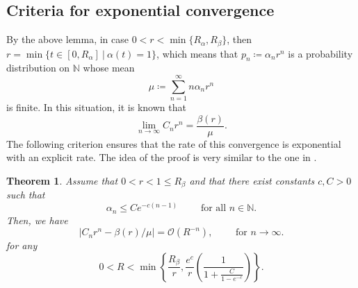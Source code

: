 \documentclass[letterpaper, DIV=17]{scrartcl}
\newtheorem{theorem}{Theorem}[section]  %
\numberwithin{equation}{section}
\theoremstyle{definition}
\begin{document}
		\subsection{Criteria for exponential convergence}
		By the above lemma, in case $ 0 < r < \min\{ R_\alpha, R_\beta \}  $, then $ r = \min\{ t \in [0,R_\alpha]    \ \big| \ \alpha(t) = 1 \} $, which means that $p_n \coloneqq \alpha_n r^n $ is a probability distribution on $ \mathbb{N} $ whose mean
		\begin{equation}
		\mu \coloneqq \sum_{n=1}^{\infty} n \alpha_n r^n
		\end{equation}
		is finite. In this situation, it is known \cite[XIII, Theorem 1]{feller1968introduction} that 
		\begin{equation}\label{eq:renewalFeller}
		\lim_{n\to \infty}  C_n r^n = \frac{\beta(r)}{\mu} . 
		\end{equation} 
		The following criterion ensures that the rate of this convergence is exponential with an explicit rate.  The idea of the proof is very similar to the one in \cite{baxendale2005renewal}.
%
	\begin{theorem} \label{thm:renewal appendix}
			Assume that $0<r< 1 \leq R_\beta$ and that there exist constants $c,C>0$ such that
			\begin{equation}\label{assumption renewal theorem}
				\alpha_n \leq C e^{-c(n-1)} \qquad \text{ for all } n\in \mathbb{N}.
			\end{equation}
					Then, we have
			\begin{equation} \label{renewal decay appendix}
				\vert C_n r^n - \beta(r)/\mu \vert = \mathcal{O}(R^{-n}), \qquad \text{ for } n\rightarrow \infty.
			\end{equation}
			for any 
			$$
				0<R< \min\left\{\frac{R_\beta}{r}, \frac{e^c}{r} \left(\frac{1}{1+\frac{C}{1-e^{-c}}}\right) \right\} .
			$$
		\end{theorem}
\end{document}
